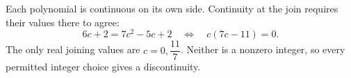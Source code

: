 Each polynomial is continuous on its own side. Continuity at the join requires their values there to agree:
\[
6c+2=7c^2-5c+2
\quad\Longleftrightarrow\quad c(7c-11)=0.
\]
The only real joining values are $\boxed{c=0,\dfrac{11}{7}}$. Neither is a nonzero integer, so every permitted integer choice gives a discontinuity.

